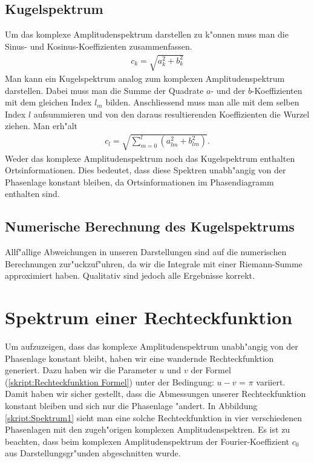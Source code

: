 \begin{refsection}
\subsection{Kugelspektrum}
Um das komplexe Amplitudenspektrum darstellen zu k"onnen muss man die
Sinus- und Kosinus-Koeffizienten zusammenfassen.
\begin{align*}
c_k= \sqrt{a^2_{k}+b^2_{k}}
\end{align*}
Man kann ein Kugelspektrum analog zum komplexen Amplitudenspektrum 
darstellen. 
Dabei muss man die Summe der Quadrate $a$- und der $b$-Koeffizienten mit 
dem gleichen Index $l_m$ bilden. Anschliessend muss man alle 
mit dem selben Index $l$ aufsummieren und von den daraus resultierenden 
Koeffizienten die Wurzel ziehen. Man erh"alt 
\begin{align*}
c_l= \sqrt{\sum_{m=0}^l (a^2_{lm}+b^2_{lm})} .
\end{align*}
Weder das komplexe Amplitudenspektrum noch das Kugelspektrum enthalten 
Ortsinformationen. 
Dies bedeutet, dass diese Spektren unabh"angig von der
Phasenlage konstant bleiben, da Ortsinformationen im 
Phasendiagramm enthalten sind.

\subsection{Numerische Berechnung des Kugelspektrums}
Allf"allige Abweichungen in unseren Darstellungen sind auf die 
numerischen Berechnungen zur"uckzuf"uhren, da wir die Integrale  
mit einer Riemann-Summe approximiert haben.
Qualitativ sind jedoch alle Ergebnisse korrekt. 

\section{Spektrum einer Rechteckfunktion}
Um aufzuzeigen, dass das komplexe Amplitudenspektrum unabh"angig von 
der Phasenlage konstant bleibt, haben wir eine wandernde 
Rechteckfunktion generiert. 
Dazu haben wir die Parameter $u$ und $v$ der Formel 
(\ref{skript:Rechteckfunktion Formel})
unter der Bedingung: $u - v$ = $\pi$ variiert.
Damit haben wir sicher gestellt, dass die Abmessungen unserer 
Rechteckfunktion konstant bleiben und sich nur die Phasenlage "andert.
In Abbildung \ref{skript:Spektrum1} sieht man eine solche 
Rechteckfunktion in vier verschiedenen Phasenlagen mit den zugeh"origen 
komplexen Amplitudenspektren. 
Es ist zu beachten, dass beim komplexen Amplitudenspektrum der 
Fourier-Koeffizient $c_0$ aus Darstellungsgr"unden abgeschnitten wurde.


\end{refsection}
